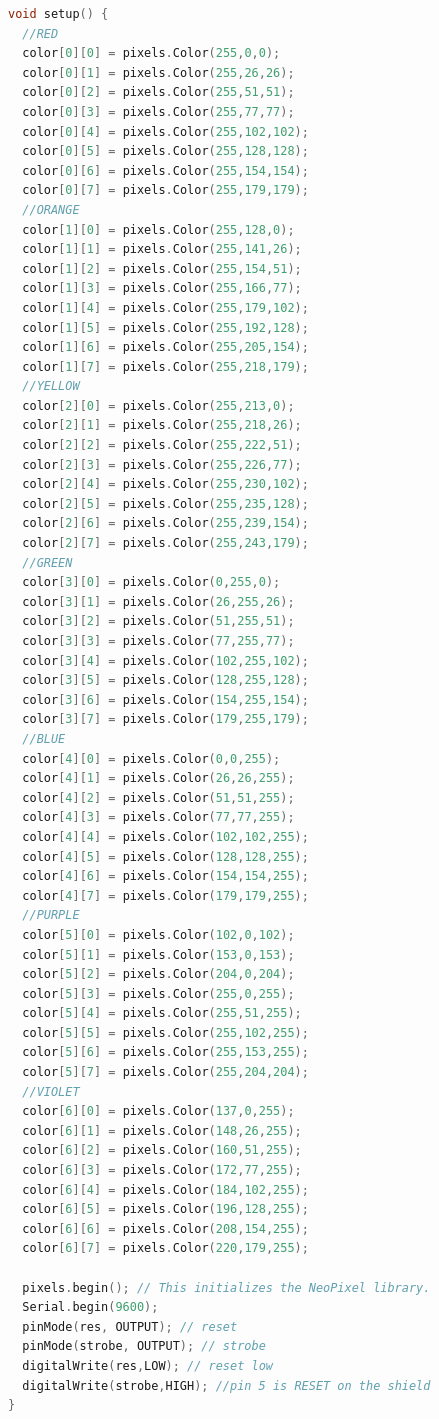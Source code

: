 \documentclass[12pt,a4paper,journal]{IEEEtran}
\begin{document}
\begin{lstlisting}[language={C}, caption=main.cpp, keywordstyle=\color{blue!70}, commentstyle=\color{red!50!green!50!blue!50}, rulesepcolor=\color{red!20!green!20!blue!20}]
void setup() {
  //RED
  color[0][0] = pixels.Color(255,0,0);
  color[0][1] = pixels.Color(255,26,26);
  color[0][2] = pixels.Color(255,51,51);
  color[0][3] = pixels.Color(255,77,77);
  color[0][4] = pixels.Color(255,102,102);
  color[0][5] = pixels.Color(255,128,128);
  color[0][6] = pixels.Color(255,154,154);
  color[0][7] = pixels.Color(255,179,179);
  //ORANGE
  color[1][0] = pixels.Color(255,128,0);
  color[1][1] = pixels.Color(255,141,26);
  color[1][2] = pixels.Color(255,154,51);
  color[1][3] = pixels.Color(255,166,77);
  color[1][4] = pixels.Color(255,179,102);
  color[1][5] = pixels.Color(255,192,128);
  color[1][6] = pixels.Color(255,205,154);
  color[1][7] = pixels.Color(255,218,179);
  //YELLOW
  color[2][0] = pixels.Color(255,213,0);
  color[2][1] = pixels.Color(255,218,26);
  color[2][2] = pixels.Color(255,222,51);
  color[2][3] = pixels.Color(255,226,77);
  color[2][4] = pixels.Color(255,230,102);
  color[2][5] = pixels.Color(255,235,128);
  color[2][6] = pixels.Color(255,239,154);
  color[2][7] = pixels.Color(255,243,179);
  //GREEN
  color[3][0] = pixels.Color(0,255,0);
  color[3][1] = pixels.Color(26,255,26);
  color[3][2] = pixels.Color(51,255,51);
  color[3][3] = pixels.Color(77,255,77);
  color[3][4] = pixels.Color(102,255,102);
  color[3][5] = pixels.Color(128,255,128);
  color[3][6] = pixels.Color(154,255,154);
  color[3][7] = pixels.Color(179,255,179);
  //BLUE
  color[4][0] = pixels.Color(0,0,255);
  color[4][1] = pixels.Color(26,26,255);
  color[4][2] = pixels.Color(51,51,255);
  color[4][3] = pixels.Color(77,77,255);
  color[4][4] = pixels.Color(102,102,255);
  color[4][5] = pixels.Color(128,128,255);
  color[4][6] = pixels.Color(154,154,255);
  color[4][7] = pixels.Color(179,179,255);
  //PURPLE
  color[5][0] = pixels.Color(102,0,102);
  color[5][1] = pixels.Color(153,0,153);
  color[5][2] = pixels.Color(204,0,204);
  color[5][3] = pixels.Color(255,0,255);
  color[5][4] = pixels.Color(255,51,255);
  color[5][5] = pixels.Color(255,102,255);
  color[5][6] = pixels.Color(255,153,255);
  color[5][7] = pixels.Color(255,204,204);
  //VIOLET
  color[6][0] = pixels.Color(137,0,255);
  color[6][1] = pixels.Color(148,26,255);
  color[6][2] = pixels.Color(160,51,255);
  color[6][3] = pixels.Color(172,77,255);
  color[6][4] = pixels.Color(184,102,255);
  color[6][5] = pixels.Color(196,128,255);
  color[6][6] = pixels.Color(208,154,255);
  color[6][7] = pixels.Color(220,179,255);
  
  pixels.begin(); // This initializes the NeoPixel library.
  Serial.begin(9600);
  pinMode(res, OUTPUT); // reset
  pinMode(strobe, OUTPUT); // strobe
  digitalWrite(res,LOW); // reset low
  digitalWrite(strobe,HIGH); //pin 5 is RESET on the shield
}


\end{lstlisting}
\end{document}
